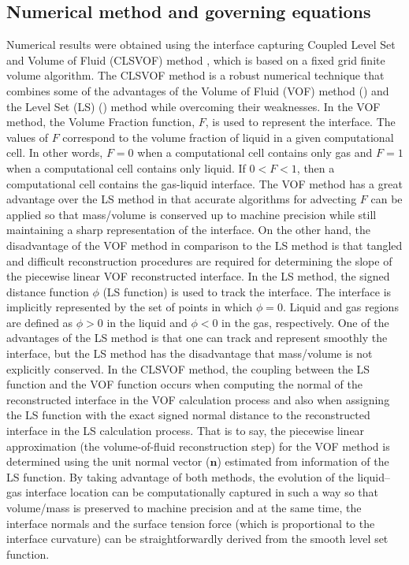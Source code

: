 \documentclass[%
 reprint,
 showkeys,
 amsmath,amssymb,
 aps,
 prfluids,
 onecolumn
]{revtex4-2}
\begin{document}
\subsection{Numerical method and governing equations}
Numerical results were obtained using the {\color{red} interface capturing} 
Coupled Level Set and Volume of Fluid (CLSVOF) 
method \cite{SusPuc00,SUSSMAN2007469},
which is based on a fixed grid finite volume algorithm.  
{\color{red}The CLSVOF method is a robust  numerical  technique  
that  combines  some  of  the  advantages  of 
the Volume of Fluid (VOF) method (\cite{HirNic81}) 
and the Level Set (LS) (\cite{SusSmeOsh94}) method
while overcoming their weaknesses. 
In the VOF method,  the Volume Fraction function, $F$, is used to 
represent the interface. The values of $F$ correspond 
to the volume fraction of liquid in a given computational cell. 
In other words, $F = 0$ when a computational cell contains 
only gas and $F = 1$ when a computational cell contains only liquid. 
If $0 < F < 1$, then a computational cell contains 
the gas-liquid interface. The VOF method has a great advantage 
over the LS method in that accurate algorithms for 
advecting $F$ can be applied
so that mass/volume is conserved up to machine precision
while still maintaining a sharp representation of the interface. 
On the other hand, the disadvantage of the VOF method in comparison
to the LS method 
is that tangled and difficult reconstruction procedures are required 
for determining the slope of the piecewise linear VOF reconstructed interface.
In the LS method, the signed distance function $\phi$ (LS function) 
is used to track the interface. The interface is implicitly 
represented by the set of points in which $\phi = 0$. 
Liquid and gas regions are defined as $\phi > 0$ in the 
liquid and $\phi < 0$ in the gas, respectively.  
One of the advantages of the LS method is that one can track and represent 
smoothly the interface, but the LS method has the disadvantage 
that mass/volume is not explicitly conserved. 
In the CLSVOF method, the coupling between the LS function 
and the VOF function occurs when computing the normal of the reconstructed 
interface in the VOF calculation process and also when assigning 
the LS function with the exact signed normal distance to the reconstructed 
interface in the LS calculation process. That is to say, the 
piecewise linear approximation (the volume-of-fluid reconstruction step) 
for the 
VOF method is determined using the unit normal vector ($\bm n$) 
estimated from information of the LS function. By taking 
advantage of both 
methods, the evolution of the liquid–gas interface location can be
computationally captured in such a way so that volume/mass is preserved
to machine precision and at the same time,
the interface normals and the surface tension force 
(which is proportional
to the interface curvature) can be straightforwardly derived from the
smooth level set function. }
\end{document}
